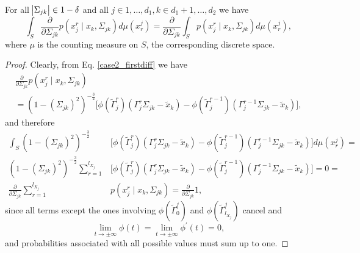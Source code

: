 \begin{lemma}\label{interchange_caseII_firstdif}
    For all $\abs{\Sigma_{jk}} \in 1-\delta$ and all $j \in 1, \dots, d_1, k\in d_1 +1, \dots, d_2$ we have
    \begin{equation*}
        \int_S \frac{\partial }{\partial \Sigma_{jk}} p(x_j^{r} \mid x_{k}, \Sigma_{jk}) d\mu(x_r^j)= \frac{\partial }{\partial \Sigma_{jk}} \int_S p(x_j^{r} \mid x_{k}, \Sigma_{jk}) d\mu(x_r^j),
    \end{equation*}
    where $\mu$ is the counting measure on $S$, the corresponding discrete space.
    
    \begin{proof}
        Clearly, from Eq. \eqref{case2_firstdiff} we have 
        \begin{multline*}
            \frac{\partial }{\partial \Sigma_{jk}} p(x_j^{r} \mid x_{k}, \Sigma_{jk}) \\
            =  (1-(\Sigma_{jk})^2)^{-\frac{3}{2}}\Big[\phi({\tilde{\Gamma}}_j^{r})({\Gamma}_j^r\Sigma_{jk} - {\tilde{x}}_{k}) - \phi({\tilde{\Gamma}}_j^{r-1})({\Gamma}_j^{r-1}\Sigma_{jk} - {\tilde{x}}_{k})\Big],
        \end{multline*}
        and therefore 
        \begin{equation*}
            \begin{split}
                \int_S (1-(\Sigma_{jk})^2)^{-\frac{3}{2}}&\Big[\phi({\tilde{\Gamma}}_j^{r})({\Gamma}_j^r\Sigma_{jk} - {\tilde{x}}_{k}) - \phi({\tilde{\Gamma}}_j^{r-1})({\Gamma}_j^{r-1}\Sigma_{jk} - {\tilde{x}}_{k})\Big] d\mu(x_r^j) = \\
                (1-(\Sigma_{jk})^2)^{-\frac{3}{2}} \sum_{r=1}^{l_{X_j}} &\Big[\phi({\tilde{\Gamma}}_j^{r})({\Gamma}_j^r\Sigma_{jk} - {\tilde{x}}_{k}) - \phi({\tilde{\Gamma}}_j^{r-1})({\Gamma}_j^{r-1}\Sigma_{jk} - {\tilde{x}}_{k})\Big] = 0 = \\
                \frac{\partial }{\partial \Sigma_{jk}} \sum_{r=1}^{l_{X_j}} &p(x_j^{r} \mid x_{k}, \Sigma_{jk}) = \frac{\partial }{\partial \Sigma_{jk}} 1,
            \end{split}
        \end{equation*}
        since all terms except the ones involving $\phi({\tilde{\Gamma}}^j_{0})$ and $\phi({\tilde{\Gamma}}^j_{l_{X_j}})$ cancel and 
        \begin{equation*}
            \lim\limits_{t \to \pm \infty} \phi(t) = \lim\limits_{t \to \pm \infty} \phi^\prime(t) = 0,
        \end{equation*} 
        and probabilities associated with all possible values must sum up to one. 
    \end{proof}
\end{lemma}

